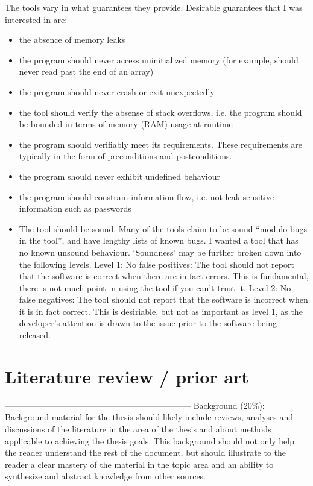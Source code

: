 \documentclass[12pt,openany,a4paper]{book}
\begin{document}
The tools vary in what guarantees they provide. Desirable guarantees that I was interested in are: 
\label{criteria}
\begin{itemize}
	\item the absence of memory leaks
	\item the program should never access uninitialized memory (for example, should never read past the end of an array)
	\item the program should never crash or exit unexpectedly
	\item the tool should verify the absense of stack overflows, i.e. the program should be bounded in terms of memory (RAM) usage at runtime
	\item the program should verifiably meet its requirements. These requirements are typically in the form of preconditions and postconditions.
	\item the program should never exhibit undefined behaviour
	\item the program should constrain information flow, i.e. not leak sensitive information such as passwords
	\item The tool should be sound. Many of the tools claim to be sound ``modulo bugs in the tool'', and have lengthy lists of known bugs. I wanted a tool that has no known unsound behaviour. `Soundness' may be further broken down into the following levels.
	\subitem Level 1: No false positives: The tool should not report that the software is correct when there are in fact errors. This is fundamental, there is not much point in using the tool if you can't trust it.
	\subitem Level 2: No false negatives: The tool should not report that the software is incorrect when it is in fact correct. This is desiriable, but not as important as level 1, as the developer's attention is drawn to the issue prior to the software being released.


\end{itemize}

\chapter{Literature review / prior art}

------------------------------------------------------------------
Background (20\%): Background material for the thesis should likely include reviews, analyses and
discussions of the literature in the area of the thesis and about methods applicable to achieving
the thesis goals. This background should not only help the reader understand the rest of the document,
but should illustrate to the reader a clear mastery of the material in the topic area and an
ability to synthesize and abstract knowledge from other sources.
\end{document}
